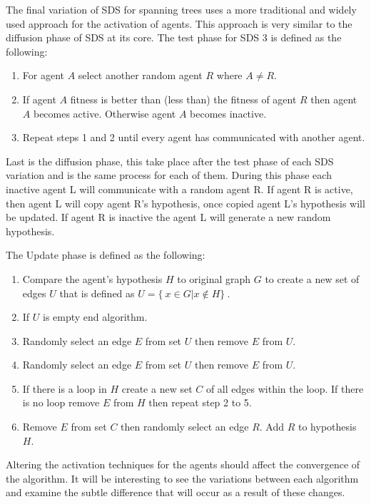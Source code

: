\documentclass{AISB2008}
\begin{document}
The final variation of SDS for spanning trees uses a more traditional and widely used approach for the activation of agents. This approach is very similar to the diffusion phase of SDS at its core.
The test phase for SDS 3 is defined as the following:

\begin{enumerate}
\item For agent {$A$} select another random agent {$R$} where {$A \ne R$}.
\item If agent {$A$} fitness is better than (less than) the fitness of agent {$R$} then agent {$A$} becomes active. Otherwise agent  {$A$} becomes inactive.
\item Repeat steps 1 and 2 until every agent has communicated with another agent.
\end{enumerate}

Last is the diffusion phase, this take place after the test phase of each SDS variation and is the same process for each of them. During this phase each inactive agent L will communicate with a random agent R. If agent R is active, then agent L will copy agent R’s hypothesis, once copied agent L’s hypothesis will be updated. If agent R is inactive the agent L will generate a new random hypothesis. 

The Update phase is defined as the following:

\begin{enumerate}
\item Compare the agent’s hypothesis {$H$} to original graph {$G$} to create a new set of edges {$U$} that is defined as {$U = \{\ x \in G | x \notin H \}\ $}.
\item If {$U$} is empty end algorithm.
\item Randomly select an edge {$E$} from set {$U$} then remove {$E$} from {$U$}. 
\item Randomly select an edge {$E$} from set {$U$} then remove {$E$} from {$U$}. 
\item If there is a loop in {$H$} create a new set {$C$} of all edges within the loop. If there is no loop remove {$E$} from {$H$} then repeat step 2 to 5.
\item Remove {$E$} from set {$C$} then randomly select an edge {$R$}. Add {$R$} to hypothesis {$H$}.
\end{enumerate}

Altering the activation techniques for the agents should affect the convergence of the algorithm. It will be interesting to see the variations between each algorithm and examine the subtle difference that will occur as a result of these changes.
\end{document}
